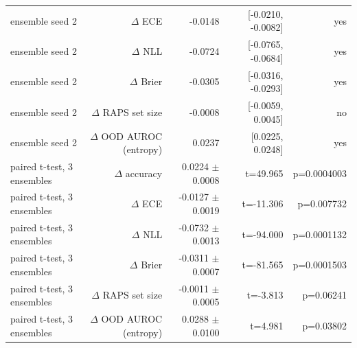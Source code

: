 \begin{table}
\begin{tabular}{lrrrr}
           ensemble seed 2 &                 $\Delta$ ECE &                       -0.0148 & [-0.0210, -0.0082] &         yes \\
           ensemble seed 2 &                 $\Delta$ NLL &                       -0.0724 & [-0.0765, -0.0684] &         yes \\
           ensemble seed 2 &               $\Delta$ Brier &                       -0.0305 & [-0.0316, -0.0293] &         yes \\
           ensemble seed 2 &       $\Delta$ RAPS set size &                       -0.0008 &  [-0.0059, 0.0045] &          no \\
           ensemble seed 2 & $\Delta$ OOD AUROC (entropy) &                        0.0237 &   [0.0225, 0.0248] &         yes \\
paired t-test, 3 ensembles &            $\Delta$ accuracy &               0.0224 $\pm$ 0.0008 &           t=49.965 & p=0.0004003 \\
paired t-test, 3 ensembles &                 $\Delta$ ECE &              -0.0127 $\pm$ 0.0019 &          t=-11.306 &  p=0.007732 \\
paired t-test, 3 ensembles &                 $\Delta$ NLL &              -0.0732 $\pm$ 0.0013 &          t=-94.000 & p=0.0001132 \\
paired t-test, 3 ensembles &               $\Delta$ Brier &              -0.0311 $\pm$ 0.0007 &          t=-81.565 & p=0.0001503 \\
paired t-test, 3 ensembles &       $\Delta$ RAPS set size &              -0.0011 $\pm$ 0.0005 &           t=-3.813 &   p=0.06241 \\
paired t-test, 3 ensembles & $\Delta$ OOD AUROC (entropy) &               0.0288 $\pm$ 0.0100 &            t=4.981 &   p=0.03802 \\
\bottomrule
\end{tabular}
\end{table}
